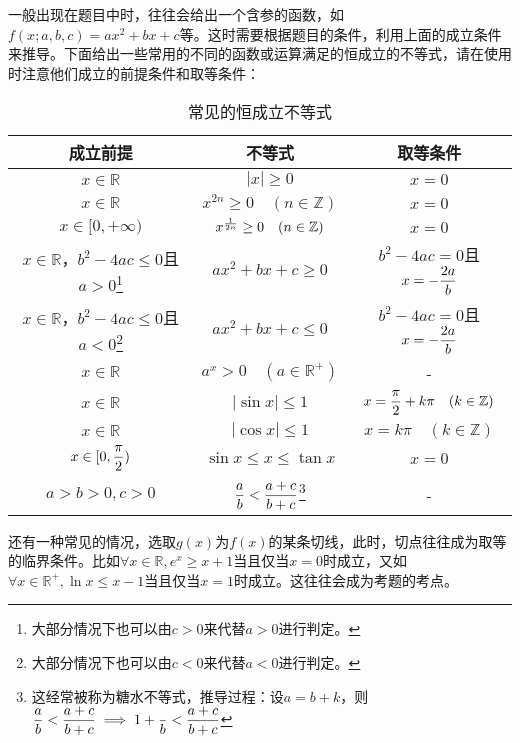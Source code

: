 一般出现在题目中时，往往会给出一个含参的函数，如$f(x;a,b,c)=ax^2+bx+c$等。这时需要根据题目的条件，利用上面的成立条件来推导。下面给出一些常用的不同的函数或运算满足的恒成立的不等式，请在使用时注意他们成立的前提条件和取等条件：
\begin{table}[ht]
\centering
\caption{常见的恒成立不等式}\label{tab_HsIden1}
\begin{tabular}{|c|c|c|}
\hline
成立前提 & 不等式 & 取等条件 \\
\hline
$x\in\mathbb{R}$&$|x|\geq0$&$x=0$ \\
\hline
$x\in\mathbb{R}$&$x^{2n}\geq0\quad(n\in\mathbb{Z})$&$x=0$\\
\hline
$x\in[0,+\infty)$&$x^{1\over2n}\geq0\quad(n\in\mathbb{Z})$&$x=0$\\
\hline
$x\in\mathbb{R}$，$b^2-4ac\leq0$且$a>0$\footnote{大部分情况下也可以由$c>0$来代替$a>0$进行判定。}&$ax^2+bx+c\geq0$&$b^2-4ac=0$且$\displaystyle x=-{2a\over b}$\\
\hline
$x\in\mathbb{R}$，$b^2-4ac\leq0$且$a<0$\footnote{大部分情况下也可以由$c<0$来代替$a<0$进行判定。}&$ax^2+bx+c\leq0$&$b^2-4ac=0$且$\displaystyle x=-{2a\over b}$\\
\hline
$x\in\mathbb{R}$&$a^x>0\quad(a\in\mathbb{R}^+)$&-\\
\hline
$x\in\mathbb{R}$&$|\sin x|\leq 1$&$\displaystyle x={\pi\over2}+k\pi\quad (k\in\mathbb{Z})$\\
\hline
$x\in\mathbb{R}$&$|\cos x|\leq 1$&$x=k\pi\quad (k\in\mathbb{Z})$\\
\hline
$\displaystyle x\in[0,{\pi\over2})$&$\sin x\leq x\leq\tan x$&$x=0$\\
\hline
$\displaystyle a>b>0,c>0$&$\displaystyle{a\over b}<{a+c\over b+c}$\footnote{这经常被称为糖水不等式，推导过程：设$a=b+k$，则$\displaystyle{a\over b}<{a+c\over b+c}\implies\displaystyle1+{\over b}<{a+c\over b+c}$}&-\\
\hline
\end{tabular}
\end{table}


还有一种常见的情况，选取$g(x)$为$f(x)$的某条切线，此时，切点往往成为取等的临界条件。比如$\forall x\in\mathbb{R},e^x\geq x+1$当且仅当$x=0$时成立，又如$\forall x\in\mathbb{R}^+,\ln x\leq x-1$当且仅当$x=1$时成立。这往往会成为考题的考点。

